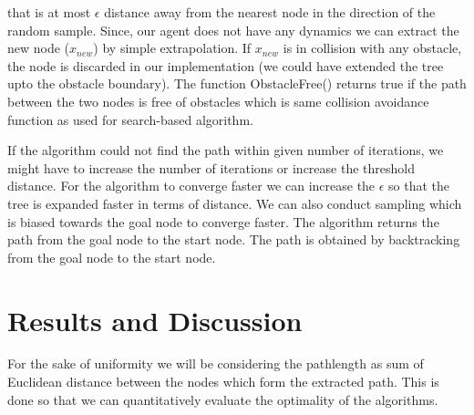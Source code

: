 \documentclass[conference]{IEEEtran}
\begin{document}
that is at most $\epsilon$ distance away from the nearest node in the direction of the random sample. Since, our agent does not have any dynamics we can extract the new node ($x_{new}$) by simple extrapolation. If $x_{new}$ is in collision with any obstacle, the node is discarded in our implementation (we could have extended the tree upto the obstacle boundary).
The function ObstacleFree() returns true if the path between the two nodes is free of obstacles which is same collision avoidance function 
as used for search-based algorithm. 
\par If the algorithm could not find the path within given number of iterations, we might have to increase the number of iterations or increase the threshold distance. 
For the algorithm to converge faster we can increase the $\epsilon$ so that the tree is expanded faster in terms of distance. We can also conduct sampling which is biased towards the goal node to converge faster.
The algorithm returns the path from the goal node to the start node. The path is obtained by backtracking from the goal node to the start node.
\section{Results and Discussion}
For the sake of uniformity we will be considering the pathlength as sum of Euclidean distance between the nodes which form the extracted path.
This is done so that we can quantitatively evaluate the optimality of the algorithms.
\end{document}
